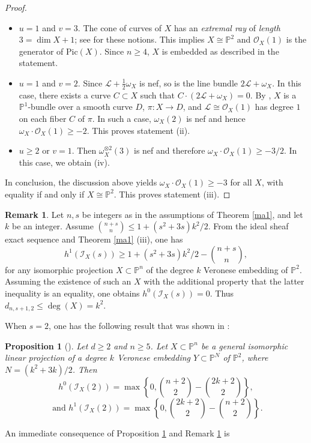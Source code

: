 \documentclass[a4, 11pt]{amsart}
\theoremstyle{plain}
\newtheorem{proposition}[theorem]{Proposition}
\theoremstyle{definition}
\newtheorem{remark}[theorem]{Remark}
\newcommand{\enm}[1]{\ensuremath{#1}}          %
\newcommand{\cal}[1]{\mathcal{#1}}
\newcommand{\PP}{\enm{\mathbb{P}}}
\newcommand{\Ii}{\enm{\cal{I}}}
\newcommand{\Ll}{\enm{\cal{L}}}
\newcommand{\Oo}{\enm{\cal{O}}}
\renewcommand{\to}[1][]{\xrightarrow{\ #1\ }}
\begin{document}
\begin{proof}
\begin{itemize}
\item $u=1$ and $v=3$. The cone of curves of $X$ has an {\it extremal ray} of {\it length} $3 =\dim X +1$; see \cite{matsuki} for these notions. This implies $X\cong \PP^2$ and $\Oo _X(1)$ is the generator of $\mathrm{Pic}(X)$. Since $n\ge 4$, $X$ is embedded as described in the statement. 
\vspace{2mm}
\item $u=1$ and $v=2$. Since $\Ll+\frac{1}{2}\omega _X$ is nef, so is the line bundle $2\Ll+\omega _X$. In this case, there exists a curve $C\subset X$ such that $C\cdot (2\Ll+\omega _X) =0$. By \cite[Theorem 1-4-8]{matsuki}, $X$ is a $\PP^1$-bundle over a smooth curve $D$, $\pi: X\to D$, and $\Ll\cong\Oo _X(1)$ has degree $1$ on each fiber $C$ of $\pi$. In such a case, $\omega _X(2)$ is nef and hence $\omega_X\cdot \Oo_X(1) \geq -2$. This proves statement (ii). \\
\vspace{2mm}
\item $u\ge 2$ or $v=1$. Then $\omega _X^{\otimes 2}(3)$ is nef and therefore $\omega_X\cdot \Oo_X(1)\geq -3/2$. In this case,
we obtain (iv). 
\end{itemize}
In conclusion, the discussion above yields $\omega_X\cdot \Oo_X(1)\geq -3$ for all $X$, with equality if and only if $X\cong \PP^2$. This proves statement (iii).\end{proof}

\begin{remark}\label{ma2}
Let $n, s$ be integers as in the assumptions of Theorem \ref{ma1}, and let $k$ be an integer.  Assume $\binom{n+s}{n} \le 1+(s^2+3s)k^2/2$. From the ideal sheaf exact sequence and Theorem \ref{ma1} (iii), one has 
\[
h^1(\Ii _X(s)) \ge 1+(s^2+3s)k^2/2 -\binom{n+s}{n},
\]
for any isomorphic projection $X\subset \PP^n$ of the degree $k$ Veronese embedding of $\PP^2$. Assuming the existence of such an $X$ with the additional property that the latter inequality is an equality, one obtains $h^0(\Ii_X(s))=0$. Thus $d_{n,s+1,2} \le \deg(X) = k^2$. 
\end{remark}


When $s=2$, one has the following result that was shown in \cite{bea}: 

\begin{proposition}[{\bf \cite[Theorem 2]{bea}}]\label{be1}
Let $d \ge 2$ and $n\ge 5$. Let $X\subset \PP^n$ be a general isomorphic linear projection of
a degree $k$ Veronese embedding $Y\subset \PP^N$ of $\PP^2$, where $N= (k^2+3k)/2$. Then 
\[
h^0(\Ii _X(2)) = \max \left\{0,\binom{n+2}{2} -\binom{2k+2}{2}\right\},
\]
\[
\mbox{ and } h^1(\Ii _X(2)) =  \max \left\{0,\binom{2k+2}{2}-\binom{n+2}{2} \right\}.
\]
\end{proposition}
An immediate consequence of Proposition \ref{be1} and Remark \ref{ma2} is
\end{document}
